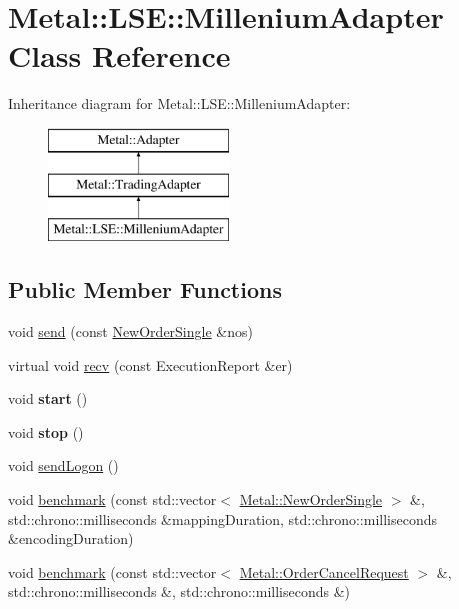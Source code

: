 \hypertarget{classMetal_1_1LSE_1_1MilleniumAdapter}{}\section{Metal\+:\+:L\+S\+E\+:\+:Millenium\+Adapter Class Reference}
\label{classMetal_1_1LSE_1_1MilleniumAdapter}
Inheritance diagram for Metal\+:\+:L\+S\+E\+:\+:Millenium\+Adapter\+:\begin{figure}[H]
\begin{center}
\leavevmode
\includegraphics[height=3.000000cm]{classMetal_1_1LSE_1_1MilleniumAdapter}
\end{center}
\end{figure}
\subsection*{Public Member Functions}
\begin{DoxyCompactItemize}
\item 
void \hyperlink{classMetal_1_1LSE_1_1MilleniumAdapter_ab3da43142636043e0ade20b0881c9976}{send} (const \hyperlink{classMetal_1_1NewOrderSingle}{New\+Order\+Single} \&nos)
\item 
virtual void \hyperlink{classMetal_1_1LSE_1_1MilleniumAdapter_add4508b367a6383b42fb2fd1744946cd}{recv} (const Execution\+Report \&er)
\item 
\hypertarget{classMetal_1_1LSE_1_1MilleniumAdapter_a402c564b7a955fac6660e6bfeee66093}{}void {\bfseries start} ()\label{classMetal_1_1LSE_1_1MilleniumAdapter_a402c564b7a955fac6660e6bfeee66093}

\item 
\hypertarget{classMetal_1_1LSE_1_1MilleniumAdapter_acb5018d36915f34612958d87ad8325af}{}void {\bfseries stop} ()\label{classMetal_1_1LSE_1_1MilleniumAdapter_acb5018d36915f34612958d87ad8325af}

\item 
void \hyperlink{classMetal_1_1LSE_1_1MilleniumAdapter_ab4bba2e8403ae7ed5b335985b4295b9f}{send\+Logon} ()
\item 
void \hyperlink{classMetal_1_1LSE_1_1MilleniumAdapter_a01a0796b972925d6a430e2f788eec5ee}{benchmark} (const std\+::vector$<$ \hyperlink{classMetal_1_1NewOrderSingle}{Metal\+::\+New\+Order\+Single} $>$ \&, std\+::chrono\+::milliseconds \&mapping\+Duration, std\+::chrono\+::milliseconds \&encoding\+Duration)
\item 
void \hyperlink{classMetal_1_1LSE_1_1MilleniumAdapter_acdfc9b84439e745de42c0f72a1e22a67}{benchmark} (const std\+::vector$<$ \hyperlink{classMetal_1_1OrderCancelRequest}{Metal\+::\+Order\+Cancel\+Request} $>$ \&, std\+::chrono\+::milliseconds \&, std\+::chrono\+::milliseconds \&)
\end{DoxyCompactItemize}
